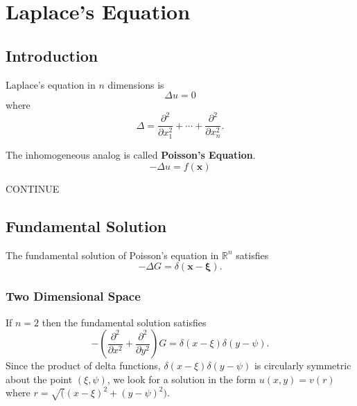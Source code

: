 \flushbottom








\chapter{Laplace's Equation}















\section{Introduction}


Laplace's equation in $n$ dimensions is
\[
\Delta u = 0
\]
where
\[
\Delta = \frac{\partial^2}{\partial x_1^2} + \cdots + \frac{\partial^2}{\partial x_n^2}.
\]


The inhomogeneous analog is called \textbf{Poisson's Equation}.
\[
- \Delta u = f(\mathbf{x})
\]

CONTINUE






\section{Fundamental Solution}



The fundamental solution of Poisson's equation in $\mathbb{R}^n$ satisfies
\[
- \Delta G = \delta(\mathbf{x} - \mathbf{\xi}).
\]


\subsection{Two Dimensional Space}


If $n = 2$ then the fundamental solution satisfies
\[
- \left(\frac{\partial^2}{\partial x^2} + \frac{\partial^2}{\partial y^2}\right) G = \delta(x - \xi) \delta(y - \psi).
\]
Since the product of delta functions, $\delta(x - \xi) \delta(y - \psi)$ is 
circularly symmetric about the point $(\xi,\psi)$, we look for a solution in 
the form $u(x,y) = v(r)$ where $r = \sqrt((x - \xi)^2 + (y - \psi)^2)$.





